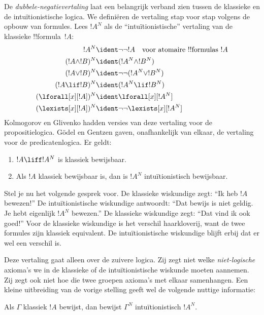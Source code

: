 \documentclass[openany]{memoir}
\begin{document}
De \emph{dubbele-negatievertaling} laat een belangrijk verband zien tussen de
klassieke en de intuïtionistische logica. We definiëren de vertaling stap voor
stap volgens de opbouw van formules. Lees $!A^N$ als de ``intuïtionistische''
vertaling van de klassieke !!{formula}~$!A$:
\begin{align*}
!A^N & \ident \lnot\lnot !A \quad \text{voor atomaire !!{formula}s $!A$} \\
(!A \land !B)^N & \ident (!A^N \land !B^N) \\
(!A \lor !B)^N & \ident  \lnot\lnot (!A^N \lor !B^N) \\
(!A \lif !B)^N & \ident (!A^N \lif !B^N) \\
(\lforall[x][!A])^N & \ident \lforall[x][!A^N] \\
(\lexists[x][!A])^N & \ident \lnot\lnot\lexists[x][!A^N]
\end{align*}
Kolmogorov en Glivenko hadden versies van deze vertaling voor de
propositielogica. G\"odel en Gentzen gaven, onafhankelijk van elkaar, de
vertaling voor de predicatenlogica. Er geldt:

\begin{thm}
\begin{enumerate}
\item $!A \liff !A^N$ is klassiek bewijsbaar.
\item Als $!A$ klassiek bewijsbaar is, dan is $!A^N$ intuïtionistisch
  bewijsbaar.
\end{enumerate}
\end{thm}

Stel je nu het volgende gesprek voor. De klassieke wiskundige zegt: ``Ik heb
$!A$ bewezen!'' De intuïtionistische wiskundige antwoordt: ``Dat bewijs is niet
geldig. Je hebt eigenlijk $!A^N$ bewezen.'' De klassieke wiskundige zegt: ``Dat
vind ik ook goed!'' Voor de klassieke wiskundige is het verschil haarkloverij,
want de twee formules zijn klassiek equivalent. De intuïtionistische wiskundige
blijft erbij dat er wel een verschil is.

Deze vertaling gaat alleen over de zuivere logica. Zij zegt niet welke
\emph{niet-logische} axioma's we in de klassieke of de intuïtionistische
wiskunde moeten aannemen. Zij zegt ook niet hoe die twee groepen axioma's met
elkaar samenhangen. Een kleine uitbreiding van de vorige stelling geeft wel de
volgende nuttige informatie:

\begin{thm}
Als $\Gamma$ klassiek $!A$ bewijst, dan bewijst $\Gamma^N$
intuïtionistisch $!A^N$.
\end{thm}
\end{document}
